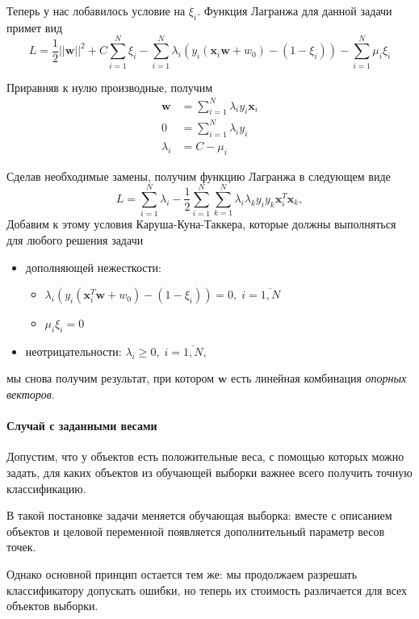 \documentclass[12pt]{article}
\renewcommand{\geq}{\ensuremath{\geqslant}}
\begin{document}
Теперь у нас лобавилось условие на $\xi_i$. Функция Лагранжа для данной задачи примет вид 
$$L = \dfrac{1}{2}||\mathbf{w}||^2 + C\sum_{i=1}^N\xi_i - \sum_{i=1}^N\lambda_i(y_i(\mathbf{x}_i\mathbf{w} + w_0) - (1-\xi_i)) - \sum_{i=1}^{N}\mu_i\xi_i$$

Приравняв к нулю производные, получим
\begin{align}
\label{eq::new_derivative}
\mathbf{w} &= \sum_{i=1}^{N}\lambda_i y_i \mathbf{x}_i
\\
0 &= \sum_{i=1}^{N}\lambda_i y_i
\\
\lambda_i &= C - \mu_i
\end{align}

Сделав необходимые замены, получим функцию Лагранжа в следующем виде
$$L = \sum_{i=1}^{N}\lambda_i - \dfrac{1}{2}\sum_{i=1}^N\sum_{k=1}^N\lambda_i\lambda_ky_iy_k\mathbf{x}_i^T\mathbf{x}
_k,$$
Добавим к этому условия Каруша-Куна-Таккера, которые должны выполняться для любого решения задачи

\begin{itemize}

\item дополняющей нежесткости:
\begin{itemize}
	\item 
 $\lambda_i(y_i(\mathbf{x}_i^T\mathbf{w} + w_0) - (1-\xi_i)) = 0, \; i = \overline{1,N}$
 \item $\mu_i\xi_i = 0$
\end{itemize}
\item неотрицательности: $\lambda_i \geq 0,  \; i = \overline{1,N}$,


\end{itemize}
мы снова получим результат, при котором $\mathbf{w}$ есть линейная комбинация \textit{опорных векторов}.

\paragraph{Случай с заданными весами}

Допустим, что у объектов есть положительные веса, с помощью которых можно задать, для каких объектов из обучающей выборки важнее всего получить точную классификацию.

В такой постановке задачи меняется обучающая выборка: вместе с описанием объектов и целовой переменной появляется дополнительный параметр весов точек. 

Однако основной принцип остается тем же: мы продолжаем разрешать классификатору допускать ошибки, но теперь их стоимость различается для всех объектов выборки. 
\end{document}
